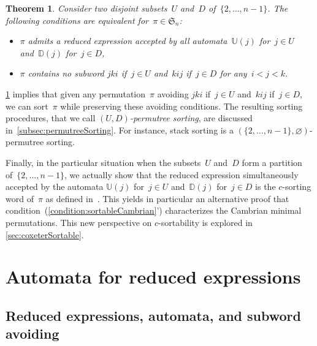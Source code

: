\documentclass{amsart}
\newtheorem{theorem}{Theorem}%
\newcommand{\fS}{\mathfrak{S}} %
\newcommand{\defn}[1]{\textsl{\color{darkblue} #1}} %
\newcommand{\automatonU}{\mathbb{U}} %
\newcommand{\automatonD}{\mathbb{D}} %
\begin{document}
\begin{theorem}\label{thm:permutreeMinimal}
Consider two disjoint subsets~$U$ and~$D$ of~$\{2, \dots, n-1\}$.
The following conditions are equivalent for~$\pi \in \fS_n$:
\begin{itemize}
	\item $\pi$ admits a reduced expression accepted by all automata~$\automatonU(j)$ for~$j \in U$ and~$\automatonD(j)$ for~${j \in D}$,
	\item $\pi$ contains no subword $jki$ if~$j \in U$ and~$kij$ if~$j \in D$ for any~$i < j < k$.
\end{itemize}
\end{theorem}

\cref{thm:permutreeMinimal} implies that given any permutation~$\pi$ avoiding $jki$ if~$j \in U$ and~$kij$ if~$j \in D$, we can sort~$\pi$ while preserving these avoiding conditions.
The resulting sorting procedures, that we call \defn{$(U,D)$-permutree sorting}, are discussed in~\cref{subsec:permutreeSorting}.
For instance, stack sorting is a $(\{2, \dots, n-1\}, \varnothing)$-permutree sorting.

Finally, in the particular situation when the subsets~$U$ and~$D$ form a partition of~$\{2, \dots, n-1\}$, we actually show that the reduced expression simultaneously accepted by the automata $\automatonU(j)$ for~${j \in U}$ and~$\automatonD(j)$ for~$j \in D$ is the $c$-sorting word of~$\pi$ as defined in~\cite{Reading-CoxeterSortable}.
This yields in particular an alternative proof that condition~(\ref{condition:sortableCambrian}') characterizes the Cambrian minimal permutations.
This new perspective on $c$-sortability is explored in \cref{sec:coxeterSortable}.


\section{Automata for reduced expressions}\label{sec:proofPatternAvoidance}

\subsection{Reduced expressions, automata, and subword avoiding}
\end{document}
